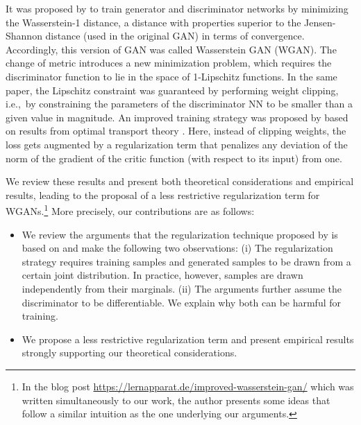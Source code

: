 \documentclass{article} %
\begin{document}
It was proposed by \citet{WGAN} to train generator and discriminator networks by minimizing the Wasserstein-1 distance, a distance with properties superior to the Jensen-Shannon distance (used in the original GAN) in terms of convergence. Accordingly, this version of GAN was called Wasserstein GAN (WGAN). The change of metric introduces a new minimization problem, which requires the discriminator function to lie in the space of 1-Lipschitz functions.  In the same paper, the Lipschitz constraint was guaranteed by performing weight clipping, i.e.,~by constraining the parameters of the discriminator NN to be smaller than a given value in magnitude. An improved training strategy was proposed by \citet{iWGAN} based on results from optimal transport theory  \citep[see][]{optimalTransport}. Here, instead of clipping weights, the loss gets augmented by a regularization term that penalizes any deviation of the norm of the gradient of the critic function (with respect to its input) from one.

We review these results and present both theoretical considerations and empirical results, leading to the proposal of a less restrictive regularization term for WGANs.\footnote{In the blog post \url{https://lernapparat.de/improved-wasserstein-gan/} which was written simultaneously to our work, the author presents some ideas that follow a similar intuition as the one underlying our arguments.}
More precisely, our contributions are as follows:
\begin{itemize}
\item We review the arguments that the regularization technique proposed by \citet{iWGAN} is based on and make the following two observations: 
(i) The regularization strategy 
requires training samples and generated samples to be drawn from a certain joint distribution. In practice, however, samples are drawn independently from their marginals. %
(ii) The arguments 
further assume the discriminator to be differentiable. 
We explain why both can be harmful for training.
\item We 
propose a less restrictive regularization term and present empirical results
strongly supporting our theoretical considerations.
\end{itemize}
\end{document}
